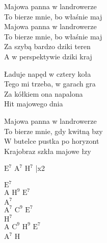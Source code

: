 \begin{text}
    \hfill\break
    \hfill\break
Majowa panna w landrowerze\\
To bierze mnie, bo właśnie maj\\
Majowa panna w landrowerze\\
To bierze mnie, bo właśnie maj\\
Za szybą bardzo dziki teren\\
A w perspektywie dziki kraj

Ładuje napęd w cztery koła\\
Tego mi trzeba, w garach gra\\
Za kółkiem ona napalona\\
Hit majowego dnia

Majowa panna w landrowerze\\
To bierze mnie, gdy kwitną bzy\\
W butelce pustka po horyzont\\
Krajobraz szkła majowe łzy
\end{text}
\begin{chord}
$\mathrm{E^7}$ $\mathrm{A^7}$ $\mathrm{H^7}$ |x2

    $\mathrm{E^7}$\\
    A $\mathrm{H^9}$ $\mathrm{E^7}$\\
    $\mathrm{A^7}$\\
    $\mathrm{A^7}$ $\mathrm{C^9}$ $\mathrm{E^7}$\\
    $\mathrm{H^7}$\\
    A $\mathrm{C^9}$ $\mathrm{H^9}$ $\mathrm{E^7}$\\
    $\mathrm{A^7}$ H
\end{chord}
